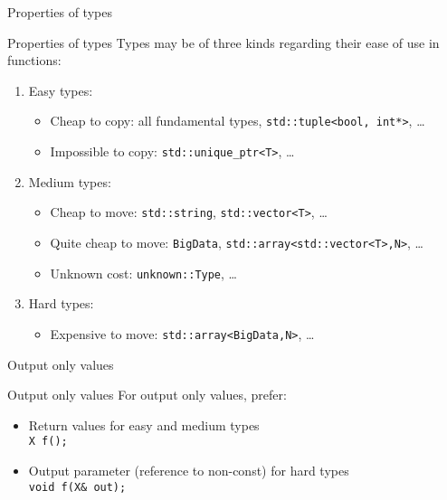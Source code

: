 
\begin{frame}{Properties of types}{}
  \begin{block}{Properties of types}
    Types may be of three kinds regarding their ease of use in functions:
    \begin{enumerate}
    \item
      Easy types:
      \begin{itemize}
      \item
        Cheap to copy: all fundamental types, \lstinline!std::tuple<bool, int*>!, \ldots
      \item
        Impossible to copy: \lstinline!std::unique_ptr<T>!, \ldots
      \end{itemize}
    \item
      Medium types:
      \begin{itemize}
      \item
        Cheap to move: \lstinline!std::string!, \lstinline!std::vector<T>!, \ldots
      \item
        Quite cheap to move: \lstinline!BigData!, \lstinline!std::array<std::vector<T>,N>!, \ldots
      \item
        Unknown cost: \lstinline!unknown::Type!, \ldots
      \end{itemize}
    \item
      Hard types:
      \begin{itemize}
      \item
        Expensive to move: \lstinline!std::array<BigData,N>!, \ldots
      \end{itemize}
    \end{enumerate}
  \end{block}
\end{frame}

\begin{frame}{Output only values}{}
  \begin{block}{Output only values}
    For output only values, prefer:
    \begin{itemize}
    \item
      Return values for easy and medium types \\
      \lstinline!X f();!
    \item
      Output parameter (reference to non-const) for hard types \\
      \lstinline!void f(X& out);!
    \end{itemize}
  \end{block}

  \begin{example}
  \end{example}
\end{frame}

